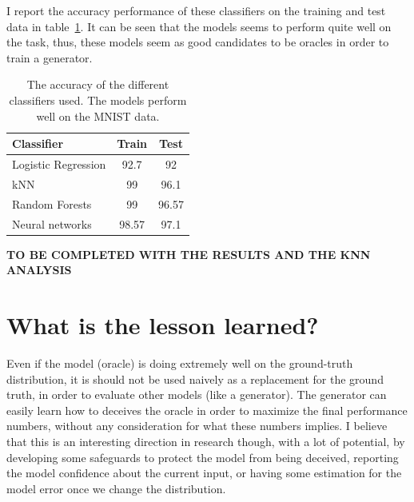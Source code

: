   \par I report the accuracy performance of these classifiers on the training and test data in table~\ref{tbl:classifier_performance}. It can be seen that the models seems to perform quite well on the task, thus, these models seem as good candidates to be oracles in order to train a generator.

  \begin{table}
    \centering
    \begin{tabular}{l c c} \hline
      Classifier & Train & Test \\ \hline
      Logistic Regression & 92.7 &  92 \\ %
      kNN & 99 & 96.1 \\ %
      Random Forests & 99 & 96.57 \\ %
      Neural networks & 98.57 & 97.1 \\ \hline
    \end{tabular}
    \caption{The accuracy of the different classifiers used. The models perform well on the MNIST data.}
    \label{tbl:classifier_performance}
  \end{table}

  \textbf{TO BE COMPLETED WITH THE RESULTS AND THE KNN ANALYSIS}

\section{What is the lesson learned?}
  \par Even if the model (oracle) is doing extremely well on the ground-truth distribution, it is should not be used naively as a replacement for the ground truth, in order to evaluate other models (like a generator). The generator can easily learn how to deceives the oracle in order to maximize the final performance numbers, without any consideration for what these numbers implies. I believe that this is an interesting direction in research though, with a lot of potential, by developing some safeguards to protect the model from being deceived, reporting the model confidence about the current input, or having some estimation for the model error once we change the distribution.
